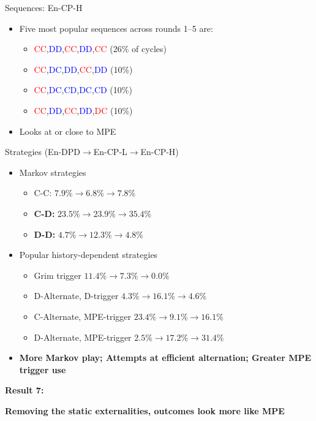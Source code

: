 \documentclass{beamer}
\begin{document}
\begin{frame}{Sequences: En-CP-H}

\begin{itemize}
\item Five most popular sequences across rounds 1--5 are:

\begin{itemize}
\item \textcolor{red}{CC},\textcolor{blue}{DD},\textcolor{red}{CC},\textcolor{blue}{DD},\textcolor{red}{CC}
(26\% of cycles)
\item \textcolor{red}{CC},\textcolor{blue}{DC},\textcolor{blue}{DD},\textcolor{red}{CC},\textcolor{blue}{DD}
(10\%)
\item \textcolor{red}{CC},\textcolor{blue}{DC},\textcolor{blue}{CD},\textcolor{blue}{DC},\textcolor{blue}{CD}
(10\%)
\item \textcolor{red}{CC},\textcolor{blue}{DD},\textcolor{red}{CC},\textcolor{blue}{DD},\textcolor{red}{DC
}(10\%)
\end{itemize}
\item Looks at or close to MPE
\end{itemize}
\end{frame}


\begin{frame}{Strategies (En-DPD$\rightarrow$En-CP-L$\rightarrow$En-CP-H)}
\begin{itemize}
\item Markov strategies

\begin{itemize}
\item C-C: $7.9\%\rightarrow6.8\%\rightarrow7.8\%$
\item \textbf{C-D:} $23.5\%\rightarrow23.9\%\rightarrow35.4\%$
\item \textbf{D-D:} $4.7\%\rightarrow12.3\%\rightarrow4.8\%$
\end{itemize}
\item Popular history-dependent strategies

\begin{itemize}
\item Grim trigger $11.4\%\rightarrow7.3\%\rightarrow0.0\%$
\item D-Alternate, D-trigger $4.3\%\rightarrow16.1\%\rightarrow4.6\%$
\item C-Alternate, MPE-trigger $23.4\%\rightarrow9.1\%\rightarrow16.1\%$
\item D-Alternate, MPE-trigger $2.5\%\rightarrow17.2\%\rightarrow31.4\%$
\end{itemize}
\item \textbf{More Markov play; Attempts at efficient alternation; Greater
MPE trigger use}
\end{itemize}
\end{frame}
\begin{frame}


\textbf{Result 7: }



\textbf{Removing the static externalities, outcomes look more like
MPE}
\end{frame}
\end{document}
